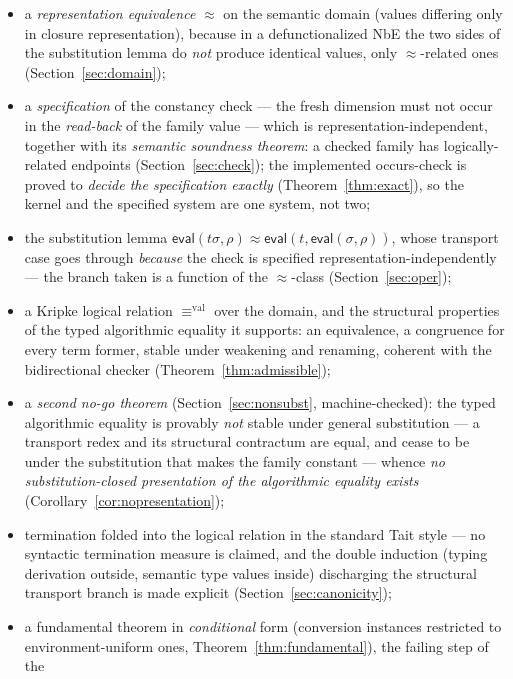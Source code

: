 \documentclass{lmcs}
\newcommand{\repeq}{\approx}
\newcommand{\valeq}{\equiv^{\mathrm{val}}}
\newcommand{\evalop}{\mathsf{eval}}
\begin{document}
\begin{itemize}
\item a \emph{representation equivalence} $\repeq$ on the semantic
  domain (values differing only in closure representation), because
  in a defunctionalized NbE the two sides of the substitution lemma
  do \emph{not} produce identical values, only $\repeq$-related ones
  (Section~\ref{sec:domain});
\item a \emph{specification} of the constancy check ---
  the fresh dimension must not occur in the \emph{read-back} of the
  family value --- which is representation-independent, together with
  its \emph{semantic soundness theorem}: a checked family has
  logically-related endpoints (Section~\ref{sec:check});
  the implemented occurs-check is proved to \emph{decide the
  specification exactly} (Theorem~\ref{thm:exact}), so the kernel and
  the specified system are one system, not two;
\item the substitution lemma
  $\evalop(t\sigma, \rho) \repeq \evalop(t, \evalop(\sigma,\rho))$,
  whose transport case goes through \emph{because} the check is
  specified representation-independently --- the branch taken is a
  function of the $\repeq$-class (Section~\ref{sec:oper});
\item a Kripke logical relation $\valeq$ over the domain, and the
  structural properties of the typed algorithmic equality it
  supports: an equivalence, a congruence for every term former,
  stable under weakening and renaming, coherent with the
  bidirectional checker (Theorem~\ref{thm:admissible});
\item a \emph{second no-go theorem}
  (Section~\ref{sec:nonsubst}, machine-checked): the typed
  algorithmic equality is provably \emph{not} stable under general
  substitution --- a transport redex and its structural contractum
  are equal, and cease to be under the substitution that makes the
  family constant --- whence \emph{no substitution-closed
  presentation of the algorithmic equality exists}
  (Corollary~\ref{cor:nopresentation});
\item termination folded into the logical relation in the standard
  Tait style --- no syntactic termination measure is claimed, and the
  double induction (typing derivation outside, semantic type values
  inside) discharging the structural transport branch is made
  explicit (Section~\ref{sec:canonicity});
\item a fundamental theorem in \emph{conditional} form
  (conversion instances restricted to environment-uniform ones,
  Theorem~\ref{thm:fundamental}), the failing step of the

\end{itemize}
\end{document}
